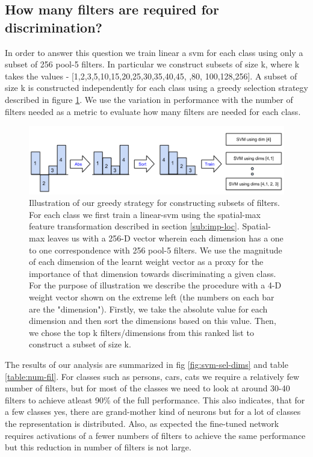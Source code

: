 \documentclass[runningheads]{llncs}
\begin{document}
\subsection{How many filters are required for discrimination?}
\label{sub:how-many}
In order to answer this question we train linear a svm for each class using only a subset of 256 pool-5 filters. In particular we construct subsets of size k, where k takes the values - [1,2,3,5,10,15,20,25,30,35,40,45, ,80, 100,128,256]. A subset of size k is constructed independently for each class using a greedy selection strategy described in figure \ref{fig:sel-strategy}. We use the variation in performance with the number of filters needed as a metric to evaluate how many filters are needed for each class. 
  
\begin{figure}[t!]
\centering
\includegraphics[scale=0.30]{images/how-many.png}
\caption{Illustration of our greedy strategy for constructing subsets of filters. For each class we first train a linear-svm using the spatial-max feature transformation described in section \ref{sub:imp-loc}. Spatial-max leaves us with a 256-D vector wherein each dimension has a one to one correspondence with 256 pool-5 filters. We use the magnitude of each dimension of the learnt weight vector as a proxy for the importance of that dimension towards discriminating a given class. For the purpose of illustration we describe the procedure with a 4-D weight vector shown on the extreme left (the numbers on each bar are the "dimension"). Firstly, we take the absolute value for each dimension and then sort the dimensions based on this value. Then, we chose the top k filters/dimensions from this ranked list to construct a subset of size k.}
\label{fig:sel-strategy}
\end{figure}

The results of our analysis are summarized in fig \ref{fig:svm-sel-dims} and table \ref{table:num-fil}. For classes such as persons, cars, cats we require a relatively few number of filters, but for most of the classes we need to look at around 30-40 filters to achieve atleast 90\% of the full performance. This also indicates, that for a few classes yes, there are grand-mother kind of neurons but for a lot of classes the representation is distributed. Also, as expected the fine-tuned network requires activations of a fewer numbers of filters to achieve the same performance but this reduction in number of filters is not large. 
\end{document}
